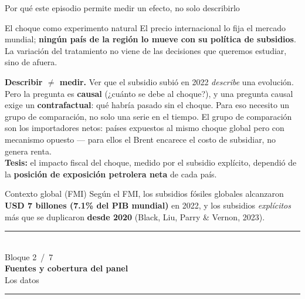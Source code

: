 \documentclass[aspectratio=169,10pt]{beamer}
\newcommand{\key}[1]{{\bfseries\color{AcentoRojo}#1}}
\newcommand{\divisor}[3]{%
  {\setbeamertemplate{footline}{}%
   \begin{frame}[plain]
     \vfill
     \begin{center}
       {\color{AcentoRojo}\rule{2.6cm}{1.2pt}}\\[0.7em]
       {\scriptsize\color{GrisMedio}Bloque #1 \,/\, 7}\\[0.6em]
       {\Large\color{Carbon}\bfseries #2}\\[0.45em]
       {\color{GrisMedio}#3}\\[0.7em]
       {\color{AcentoRojo}\rule{2.6cm}{1.2pt}}
     \end{center}
     \vfill
   \end{frame}}}
\begin{document}
\begin{frame}{Por qué este episodio permite medir un efecto, no solo describirlo}
  \small
  \begin{block}{El choque como experimento natural}
    El precio internacional lo fija el mercado mundial; \textbf{ningún país de la región lo mueve
    con su política de subsidios}. La variación del tratamiento no viene de las decisiones que
    queremos estudiar, sino de afuera.
  \end{block}

  \textbf{Describir $\neq$ medir.} Ver que el subsidio subió en 2022 \emph{describe} una
  evolución. Pero la pregunta es \textbf{causal} (¿cuánto se debe al choque?), y una pregunta
  causal exige un \textbf{contrafactual}: qué habría pasado sin el choque. Para eso necesito un
  grupo de comparación, no solo una serie en el tiempo. El grupo de comparación son los
  \alert{importadores netos}: países expuestos al mismo choque global pero con mecanismo
  opuesto — para ellos el Brent encarece el costo de subsidiar, no genera renta.\\[0.2em]
  \textbf{Tesis:} el impacto fiscal del choque, medido por el subsidio explícito,
  dependió de la \key{posición de exposición petrolera neta} de cada país.

  \begin{block}{Contexto global (FMI)}
    {\footnotesize Según el FMI, los subsidios fósiles globales alcanzaron \textbf{USD 7 billones
    (7.1\% del PIB mundial)} en 2022, y los subsidios \emph{explícitos} más que se duplicaron
    \textbf{desde 2020} (Black, Liu, Parry \& Vernon, 2023).}
  \end{block}

\end{frame}

\divisor{2}{Fuentes y cobertura del panel}{Los datos}
\end{document}
